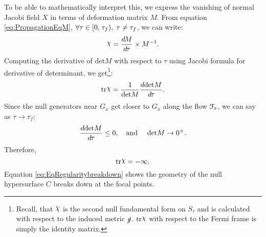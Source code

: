 \documentclass[12pt, a4paper]{report}
\theoremstyle{bfnote}
\newcommand{\chits}{\raisebox{0.5ex}{$\chi$}} %
\begin{document}
To be able to mathematically interpret this, we express the vanishing of normal
Jacobi field $X$ in terms of deformation matrix $M$. From equation
\eqref{eq:PropagationEqM}, $\forall \tau\in[0, \hspace{0.1em}\tau_f), \; \tau \neq \tau_f$, we
can write:
\begin{equation*}
    \chits = \frac{d\hspace{-0.1em}M}{d\hspace{-0.1em}\tau} \times M^{-1}.
\end{equation*}
Computing the derivative of $\mathrm{det}M$ with respect to $\tau$ using Jacobi
formula for derivative of determinant, we get\footnote[5]{Recall, that $\chits$
is the second null fundamental form on $S_\tau$ and is calculated with respect
to the induced metric $\cancel{g}$. $\mathrm{tr}\chits$ with respect to the
Fermi frame is simply the identity matrix.}:
\begin{equation}{\label{eq:trXderivativedetM}}
    \mathrm{tr}\chits = \frac{1}{\mathrm{det}M}\frac{d\mathrm{det}M}{d\hspace{-0.1em}\tau}.
\end{equation}
Since the null generators near $G_x$ get closer to $G_x$ along the flow
$\mathcal{F}_{\hspace{-0.1em}\tau}$, we can say as $\tau \to \tau_f$:
\begin{equation*}
    \frac{d\mathrm{det}M}{d\hspace{-0.1em}\tau} \leq 0, \quad \text{and } \quad \mathrm{det}M \to 0^+.
\end{equation*}
Therefore,
\begin{equation}{\label{eq:EqRegularitybreakdown}}
    \mathrm{tr}\chits = -\infty.
\end{equation}
Equation \eqref{eq:EqRegularitybreakdown} shows the geometry of the null hypersurface
$C$ breaks down at the focal points.
 




\end{document}
